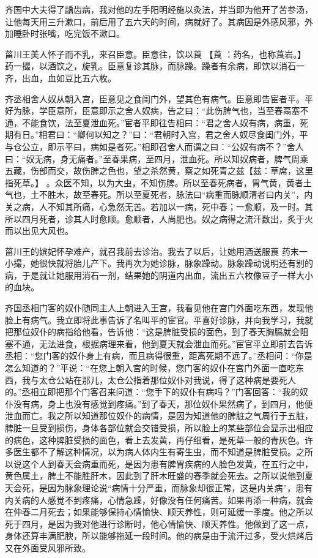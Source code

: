 \documentclass[12pt,UTF8]{ctexbook}
\begin{document}
齐国中大夫得了龋齿病，我对他的左手阳明经施以灸法，并当即为他开了苦参汤，让他每天用三升漱口，前后用了五六天的时间，病就好了。其病因是外感风邪，外加睡卧时张嘴，吃完饭不漱口。

菑川王美人怀子而不乳，来召臣意。臣意往，饮以莨 【莨 ：药名，也称莨岩。】 药一撮，以酒饮之，旋乳。臣意复诊其脉，而脉躁。躁者有余病，即饮以消石一齐，出血，血如豆比五六枚。

齐丞相舍人奴从朝入宫，臣意见之食闺门外，望其色有病气。臣意即告宦者平。平好为脉，学臣意所，臣意即示之舍人奴病，告之曰：“此伤脾气也，当至春鬲塞不通，不能食饮，法至夏泄血死。”宦者平即往告相曰：“君之舍人奴有病，病重，死期有日。”相君曰：“卿何以知之？”曰：“君朝时入宫，君之舍人奴尽食闺门外，平与仓公立，即示平曰，病如是者死。”相即召舍人而谓之曰：“公奴有病不？”舍人曰：“奴无病，身无痛者。”至春果病，至四月，泄血死。所以知奴病者，脾气周乘五藏，伤部而交，故伤脾之色也，望之杀然黄，察之如死青之兹【兹：草席，这里指死草。】 。众医不知，以为大虫，不知伤脾。所以至春死病者，胃气黄，黄者土气也，土不胜木，故至春死。所以至夏死者，脉法曰“病重而脉顺清者曰内关”，内关之病，人不知其所痛，心急然无苦。若加以一病，死中春；一愈顺，及一时。其所以四月死者，诊其人时愈顺。愈顺者，人尚肥也。奴之病得之流汗数出，炙于火而以出见大风也。

菑川王的嫔妃怀孕难产，就召我前去诊治。我去了以后，让她用酒送服莨 药末一小撮，她很快就将胎儿产下。我再次为她诊脉，脉象躁动。脉象躁动说明还有别的病，于是就让她服用消石一剂，结果她的阴道内出血，流出五六枚像豆子一样大小的血块。

齐国丞相门客的奴仆随同主人上朝进入王宫，我看见他在宫门外面吃东西，发现他脸上有病气。我立即将此事告诉了名叫平的宦官。平喜好诊脉，并向我学习，我就把那位奴仆的病指给他看，告诉他：“这是脾脏受损的面色，到了春天胸膈就会阻塞不通，无法进食，根据病理来看，他到夏天就会泄血而死。”宦官平立即前去告诉丞相：“您门客的奴仆身上有病，而且病得很重，距离死期不远了。”丞相问：“你是怎么知道的？”平说：“在您上朝入宫的时候，您门客的奴仆在宫门外面一直吃东西，我与太仓公站在那儿，太仓公指着那位奴仆对我说，得了这种病是要死人的。”丞相立即把那个门客召来问道：“您手下的奴仆有病吗？”门客回答：“我的奴仆没有病，身上也没有感觉到疼痛。”到了春天，那位奴仆果然病了，到四月，他便泄血而亡。我之所以知道那位奴仆的病情，是因为知道他的脾脏之气周行于五脏，脾脏一旦受到损伤，身体各部位就会交错受损，所以脸上的某些部位会显示出相应的病色，这种脾脏受损的面色，看上去发黄，再仔细看，是死草一般的青灰色。许多医生都不了解这种情况，以为病人体内生有寄生虫，而不知道是脾脏受损。之所以说这个人到春天会病重而死，是因为患有脾胃疾病的人脸色发黄，在五行之中，黄色属土，脾土不能胜肝木，因此到了肝木旺盛的春季就会死去。之所以说他到夏天会死，是因为脉象理论说“病情十分严重，而脉象却很正常，这是内关病”，患有内关病的人感觉不到疼痛，心情急躁，好像没有任何痛苦。如果再添一种病，就会在仲春二月死去；如果能够保持心情愉快、顺天养性，则可延缓一季度。他之所以死于四月，是因为我对他进行诊断时，他心情愉快、顺天养性。他做到了这一点，身体还算丰满肥腴，所以能够拖延一段时间。他的病是由于流汗过多，受火烘烤后又在外面受风邪所致。
\end{document}
